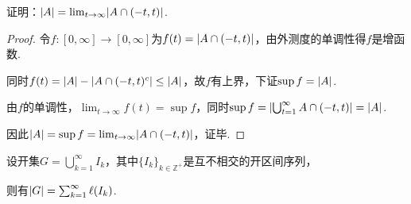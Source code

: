\begin{problem}[9]\label{2.A.9}
    证明：\(\abs*{A}=\lim_{t \to \infty}\abs*{A \cap (-t,t)}\).
\end{problem}

\begin{proof}
    令\(f: [0, \infty] \to [0, \infty]\)为\(f(t)=\abs*{A \cap (-t,t)}\)，由外测度的单调性得\(f\)是增函数.

    同时\(f(t)=\abs*{A}-\abs*{A \cap (-t,t)^c} \leq \abs*{A}\)，故\(f\)有上界，下证\(\sup f=\abs*{A}\).

    由\(f\)的单调性，\(\lim_{t \to \infty} f(t)=\sup f\)，同时\(\sup f=\abs*{\bigcup_{t=1}^\infty A \cap (-t,t)}=\abs*{A}\).

    因此\(\abs*{A}=\sup f=\lim_{t \to \infty}\abs*{A \cap (-t,t)}\)，证毕.
\end{proof}

\newpage

\begin{problem}[11]\label{2.A.11}
    设开集\(G=\bigcup_{k=1}^\infty I_k\)，其中\(\{I_k\}_{k \in \mathbb{Z}^+}\)是互不相交的开区间序列，
    
    则有\(\abs*{G}=\sum_{k=1}^\infty \ell(I_k)\).
\end{problem}

